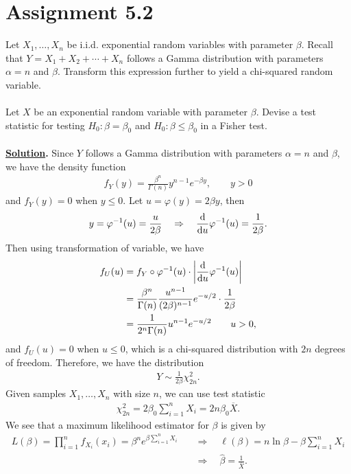 \section*{Assignment 5.2}

Let $X_1, \ldots, X_n$ be i.i.d. exponential random variables with parameter $\beta$. Recall that $Y = X_1 + X_2 + \cdots + X_n$ follows a Gamma distribution with parameters $\alpha = n$ and $\beta$. Transform this expression further to yield a chi-squared random variable.\\
~\\
Let $X$ be an exponential random variable with parameter $\beta$. Devise a test statistic for testing $H_0: \beta = \beta_0$ and $H_0: \beta\leq \beta_0$ in a Fisher test. \\
~\\
\textbf{\underline{Solution}.} Since $Y$ follows a Gamma distribution with parameters $\alpha = n$ and $\beta$, we have the density function
\begin{align*}
f_Y(y) = \frac{\beta^{n}}{\Gamma(n)} y^{n-1}e^{-\beta y}, \qquad y > 0
\end{align*}
and $f_Y(y) = 0$ when $y \leq 0$. Let $u = \varphi(y) = 2\beta y$, then
\begin{align*}
y = \varphi^{-1}(u) = \frac{u}{2\beta}\quad\Rightarrow\quad \frac{\mathrm{d}}{\mathrm{d}u}\varphi^{-1}(u) = \frac{1}{2\beta}.
\end{align*}
Then using transformation of variable, we have
\begin{align*}
f_U(u) & = f_Y\circ \varphi^{-1}(u)\cdot \left|\frac{\mathrm{d}}{\mathrm{d}u}\varphi^{-1}(u) \right| \\
& = \frac{\beta^n}{\Gamma(n)} \frac{u^{n-1}}{(2\beta)^{n-1}} e^{-u/2}\cdot \frac{1}{2\beta} \\
& = \frac{1}{2^{n}\Gamma(n)} u^{n-1}e^{-u/2} \qquad u > 0,
\end{align*}
and $f_U(u) = 0$ when $u\leq 0$, which is a chi-squared distribution with $2n$ degrees of freedom. Therefore, we have the distribution
\begin{align*}
Y \sim \frac{1}{2\beta} \chi_{2n}^2.
\end{align*}
Given samples $X_1, \ldots, X_n$ with size $n$, we can use test statistic
\begin{align*}
\chi_{2n}^2 = 2\beta_0 \sum_{i=1}^n X_i = 2n\beta_0 \overline{X}.
\end{align*}
We see that a maximum likelihood estimator for $\beta$ is given by
\begin{align*}
L(\beta) = \prod_{i=1}^n f_{X_i}(x_i) = \beta^n e^{\beta\sum_{i=1}^n X_i} \quad & \Rightarrow\quad  \ell(\beta) = n\ln \beta - \beta\sum_{i=1}^n X_i \\
& \Rightarrow\quad \widehat{\beta} = \frac{1}{\overline{X}}.
\end{align*}
